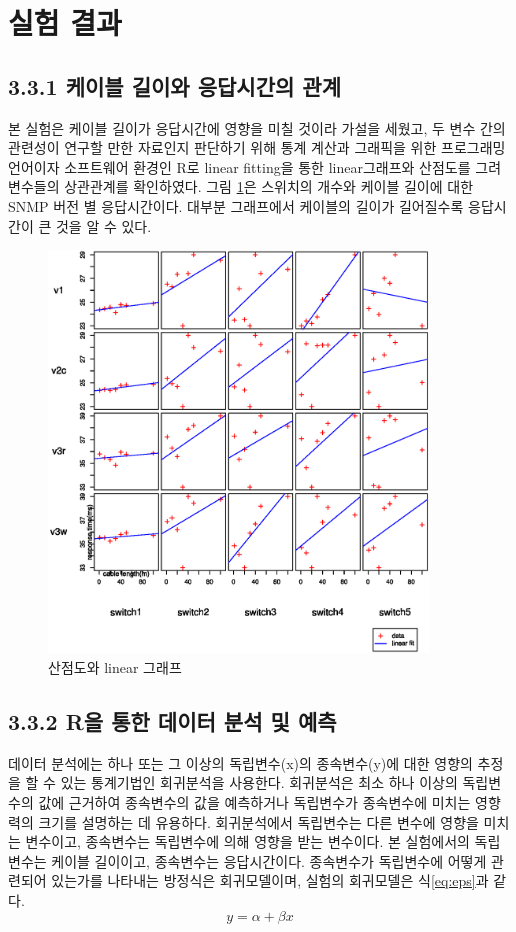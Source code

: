 \documentclass[11pt
  , a4paper
  , article
  , oneside
]{memoir}
\begin{document}
\clearpage
\section{실험 결과}
\subsection{3.3.1 케이블 길이와 응답시간의 관계}
본 실험은 케이블 길이가 응답시간에 영향을 미칠 것이라 가설을 세웠고, 두 변수 간의 관련성이 연구할 만한 자료인지 판단하기 위해 통계 계산과 그래픽을 위한 프로그래밍 언어이자 소프트웨어 환경인 R로 linear fitting을 통한 linear그래프와 산점도를 그려 변수들의 상관관계를 확인하였다. 그림 \ref{fig:linear}은 스위치의 개수와 케이블 길이에 대한 SNMP 버전 별 응답시간이다. 대부분 그래프에서 케이블의 길이가 길어질수록 응답시간이 큰 것을 알 수 있다.

\begin{figure}[!htb]
  \centering
  \includegraphics[width=0.9\textwidth]{./images/sleep1_switch.eps}
  \caption{산점도와 linear 그래프}
  \label{fig:linear}   
\end{figure}

\clearpage

\subsection{3.3.2 R을 통한 데이터 분석 및 예측}
데이터 분석에는 하나 또는 그 이상의 독립변수(x)의 종속변수(y)에 대한 영향의 추정을 할 수 있는 통계기법인 회귀분석을 사용한다. 회귀분석은 최소 하나 이상의 독립변수의 값에 근거하여 종속변수의 값을 예측하거나 독립변수가 종속변수에 미치는 영향력의 크기를 설명하는 데 유용하다. 회귀분석에서 독립변수는 다른 변수에 영향을 미치는 변수이고, 종속변수는 독립변수에 의해 영향을 받는 변수이다. 본 실험에서의 독립변수는 케이블 길이이고, 종속변수는 응답시간이다. 종속변수가 독립변수에 어떻게 관련되어 있는가를 나타내는 방정식은 회귀모델이며, 실험의 회귀모델은 식\ref{eq:eps}과 같다. 
\begin{equation} \label{eq:eps}
  y=\alpha + \beta x 
\end{equation}
\end{document}
